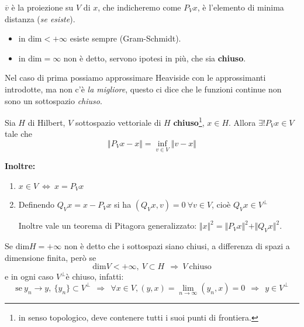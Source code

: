 $\displaystyle \overline{v}$ è la proiezione su $V$ di $x$, che indicheremo come $P_{V} x$, è l'elemento di minima distanza (\textit{se esiste}).
\begin{itemize}
    \item in $\mathrm{dim} < +\infty $ esiste sempre (Gram-Schmidt).
    \item in $\mathrm{dim} =\infty $ non è detto, servono ipotesi in più, che sia \textbf{chiuso}.
\end{itemize}

Nel caso di prima possiamo approssimare Heaviside con le approssimanti introdotte, ma non c'è \textit{la migliore}, questo ci dice che le funzioni continue non sono un sottospazio \textit{chiuso}.

\begin{theorem}
     Sia $H$ di Hilbert, $V$ sottospazio vettoriale di $H$ \textbf{chiuso}\footnote{in senso topologico, deve contenere tutti i suoi punti di frontiera.}, $x\in H$. Allora $\exists !P_{V} x\in V$ tale che
    \begin{equation*}
        \Vert P_{V} x-x\Vert =\inf_{v\in V}\Vert v-x\Vert
    \end{equation*}

    \textbf{Inoltre:}
    \begin{enumerate}
        \item $\displaystyle x\in V\ \Leftrightarrow \ x=P_{V} x$
        \item Definendo $\displaystyle Q_{V} x=x-P_{V} x$ si ha $(Q_{V} x,v) =0\ \forall v\in V$, cioè $\displaystyle Q_{V} x\in V^{\bot }$

              Inoltre vale un teorema di Pitagora generalizzato: $\Vert x\Vert ^{2} =\Vert P_{V} x\Vert ^{2} +\Vert Q_{V} x\Vert ^{2}$.
    \end{enumerate}
\end{theorem}
\begin{nb}
    Se $\displaystyle \mathrm{dim} H\mathrm{=+\infty }$ non è detto che i sottospazi siano chiusi, a differenza di spazi a dimensione finita, però se
    \begin{equation*}
        \mathrm{dim} V< +\infty,\ V\subset H\ \ \Rightarrow \ V\ \text{chiuso}
    \end{equation*}
    e in ogni caso $\displaystyle V^{\bot }$è chiuso, infatti:
    \begin{equation*}
        \text{se} \ y_{n}\rightarrow y,\ \{y_{n}\} \subset V^{\bot } \ \ \Rightarrow \ \ \forall x\in V,(y,x) =\lim _{n\rightarrow \infty }(y_{n} ,x) =0\ \ \Rightarrow \ \ y\in V^{\bot }
    \end{equation*}
\end{nb}

